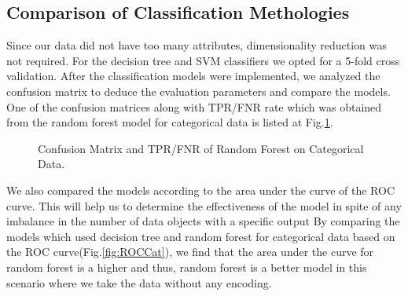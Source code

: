 \documentclass{article} %
\begin{document}
	\subsection{Comparison of Classification Methologies}
	Since our data did not have too many attributes, dimensionality reduction was not required. For the decision tree and SVM classifiers we opted for a 5-fold cross validation.
	After the classification models were implemented, we analyzed the confusion matrix to deduce the evaluation parameters and compare the models. One of the confusion matrices along with TPR/FNR rate which was obtained from the random forest model for categorical data is listed at Fig.\ref{fig:RFCM}. 
	
	\begin{figure}[h]
		\begin{center}
		\end{center}
		\caption{Confusion Matrix and TPR/FNR of Random Forest on Categorical Data.}
		\label{fig:RFCM}
	\end{figure}
	
	
	We also compared the models according to the area under the curve of the ROC curve. This will help us to determine the effectiveness of the model in spite of any imbalance in the number of data objects with a specific output
	By comparing the models which used decision tree and random forest for categorical data based on the ROC curve(Fig.\ref{fig:ROCCat}), we find that the area under the curve for random forest is a higher and thus, random forest is a better model in this scenario where we take the data without any encoding.
	
\end{document}
